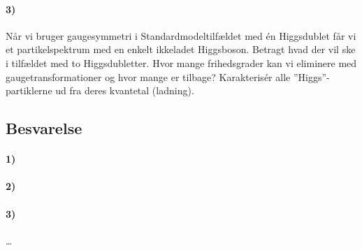 \documentclass[../main.tex]{subfiles}
\begin{document}

\paragraph*{\textbf{3)}}

Når vi bruger gaugesymmetri i Standardmodeltilfældet med én Higgsdublet får vi et partikelspektrum med en enkelt ikkeladet Higgsboson. Betragt hvad der vil ske i tilfældet med to Higgsdubletter. Hvor mange frihedsgrader kan vi eliminere med gaugetransformationer og hvor mange er tilbage? Karakterisér alle ''Higgs''-partiklerne ud fra deres kvantetal (ladning).



\subsection{Besvarelse}


\paragraph[1) Gaugebosoners masse ved valg af vakuumtilstande]{\textbf{1)}}





\paragraph[2) Betingelser for konstanterne $\mu_i$ og $\lambda_i$ i Higgspotential]{\textbf{2)}}





\paragraph[3) To Higgsdubletter vs. én Higgsdublet]{\textbf{3)}}

\ldots


\end{document}

